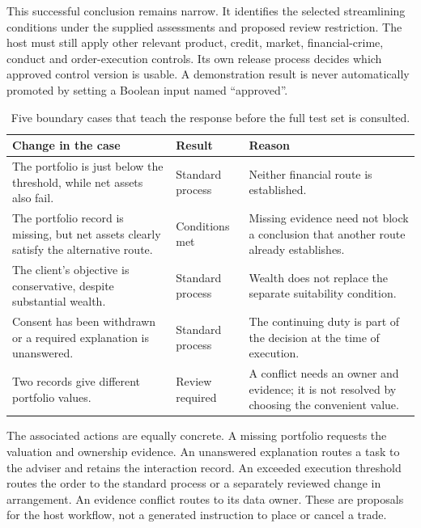 This successful conclusion remains narrow. It identifies the selected
streamlining conditions under the supplied assessments and proposed review
restriction. The host must still apply other relevant product, credit, market,
financial-crime, conduct and order-execution controls. Its own release process
decides which approved control version is usable. A demonstration result is
never automatically promoted by setting a Boolean input named ``approved''.


\begin{table}[htbp]
\centering
\caption{Five boundary cases that teach the response before the full test set is consulted.}
\label{tab:dry-cases-summary}
\begin{tabularx}{0.96\textwidth}{P{0.35\textwidth}P{0.22\textwidth}Y}
\toprule
Change in the case & Result & Reason \\ \midrule
The portfolio is just below the threshold, while net assets also fail. & Standard process & Neither financial route is established. \\
The portfolio record is missing, but net assets clearly satisfy the alternative route. & Conditions met & Missing evidence need not block a conclusion that another route already establishes. \\
The client's objective is conservative, despite substantial wealth. & Standard process & Wealth does not replace the separate suitability condition. \\
Consent has been withdrawn or a required explanation is unanswered. & Standard process & The continuing duty is part of the decision at the time of execution. \\
Two records give different portfolio values. & Review required & A conflict needs an owner and evidence; it is not resolved by choosing the convenient value. \\
\bottomrule
\end{tabularx}
\end{table}


The associated actions are equally concrete. A missing portfolio requests the
valuation and ownership evidence. An unanswered explanation routes a task to the
adviser and retains the interaction record. An exceeded execution threshold
routes the order to the standard process or a separately reviewed change in
arrangement. An evidence conflict routes to its data owner. These are proposals
for the host workflow, not a generated instruction to place or cancel a trade.

